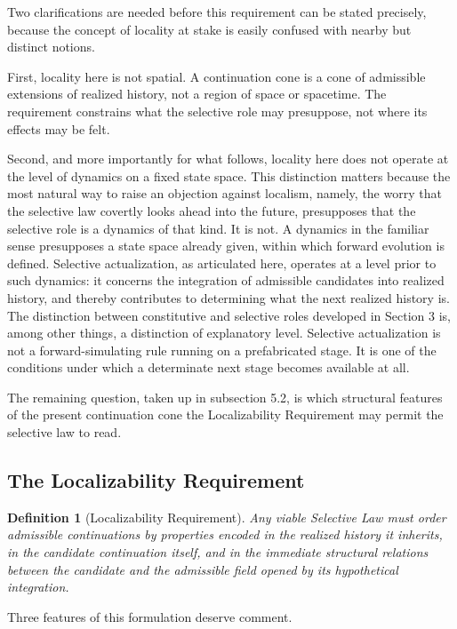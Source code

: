 \documentclass[11pt]{article}
\theoremstyle{foundation}
\newtheorem{definition}{Definition}
\begin{document}
Two clarifications are needed before this requirement can be stated precisely, because the concept of locality at stake is easily confused with nearby but distinct notions.

First, locality here is not spatial. A continuation cone is a cone of admissible extensions of realized history, not a region of space or spacetime. The requirement constrains what the selective role may presuppose, not where its effects may be felt.

Second, and more importantly for what follows, locality here does not operate at the level of dynamics on a fixed state space. This distinction matters because the most natural way to raise an objection against localism, namely, the worry that the selective law covertly looks ahead into the future, presupposes that the selective role is a dynamics of that kind. It is not. A dynamics in the familiar sense presupposes a state space already given, within which forward evolution is defined. Selective actualization, as articulated here, operates at a level prior to such dynamics: it concerns the integration of admissible candidates into realized history, and thereby contributes to determining what the next realized history is. The distinction between constitutive and selective roles developed in Section 3 is, among other things, a distinction of explanatory level. Selective actualization is not a forward-simulating rule running on a prefabricated stage. It is one of the conditions under which a determinate next stage becomes available at all.

The remaining question, taken up in subsection 5.2, is which structural features of the present continuation cone the Localizability Requirement may permit the selective law to read.

\subsection{The Localizability Requirement}

\begin{definition}[Localizability Requirement]
Any viable Selective Law must order admissible continuations by properties encoded in the realized history it inherits, in the candidate continuation itself, and in the immediate structural relations between the candidate and the admissible field opened by its hypothetical integration.
\end{definition}

Three features of this formulation deserve comment.
\end{document}

